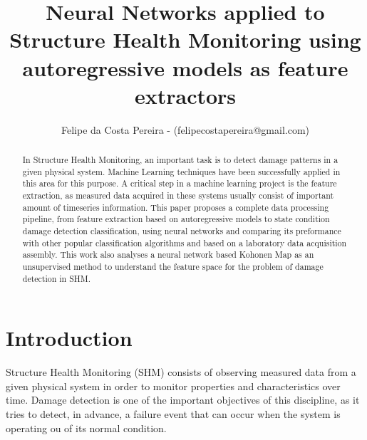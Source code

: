 \documentclass[twocolumn]{article}
\title{Neural Networks applied to Structure Health Monitoring using autoregressive models as feature extractors}
\author{Felipe da Costa Pereira - (felipecostapereira@gmail.com)}
\affil{PUC-RJ - ELE2389 - Redes Neurais - Trabalho Final}
\affil{Professora: Marley Vellasco}
\begin{document}
\maketitle


\begin{abstract}

In Structure Health Monitoring, an important task is to detect damage patterns in a given physical system. Machine Learning techniques have been successfully applied in this area for this purpose. A critical step in a machine learning project is the feature extraction, as measured data acquired in these systems usually consist of important amount of timeseries information. This paper proposes a complete data processing pipeline, from feature extraction based on autoregressive models to state condition damage detection classification, using neural networks and comparing its preformance with other popular classification algorithms and based on a laboratory data acquisition assembly. This work also analyses a neural network based Kohonen Map as an unsupervised method to understand the feature space for the problem of damage detection in SHM.



\end{abstract}



\section{Introduction}

Structure Health Monitoring (SHM) consists of observing measured data from a given physical system in order to monitor properties and characteristics over time. Damage detection is one of the important objectives of this discipline, as it tries to detect, in advance, a failure event that can occur when the system is operating ou of its normal condition.
\end{document}
